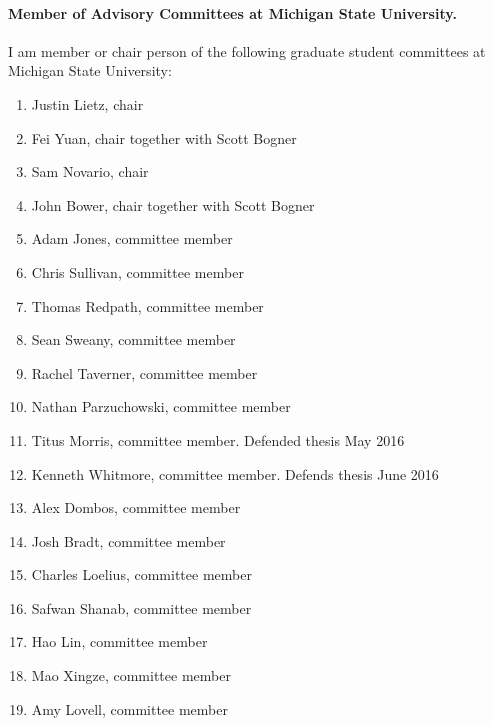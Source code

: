 \documentclass[%
oneside,                 %
final,                   %
10pt]{article}
\begin{document}
\paragraph{Member of Advisory Committees at Michigan State University.}
I am member or chair person of the following graduate  student committees at Michigan State University:
\begin{enumerate}
\item Justin Lietz, chair

\item Fei Yuan, chair together with Scott Bogner 

\item Sam Novario, chair

\item John Bower, chair together with Scott Bogner  

\item Adam Jones, committee member

\item Chris Sullivan, committee member

\item Thomas Redpath, committee member

\item Sean Sweany, committee member

\item Rachel Taverner, committee member

\item Nathan Parzuchowski, committee member

\item Titus Morris, committee member. Defended thesis May 2016

\item Kenneth Whitmore, committee member. Defends thesis June 2016

\item Alex Dombos, committee member

\item Josh Bradt, committee member

\item Charles Loelius, committee member

\item Safwan Shanab, committee member

\item Hao Lin, committee member

\item Mao Xingze, committee member

\item Amy Lovell, committee member
\end{enumerate}
\end{document}

